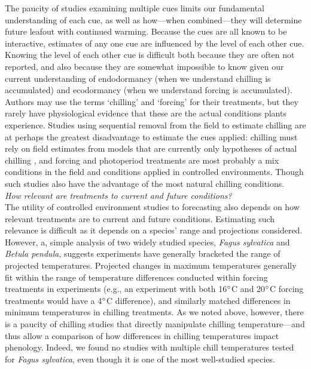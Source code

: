 \documentclass[11pt,letter]{article}
\begin{document}
The paucity of studies examining multiple cues limits our fundamental understanding of each cue, as well as how---when combined---they will determine future leafout with continued warming. Because the cues are all known to be interactive, estimates of any one cue are influenced by the level of each other cue. Knowing the level of each other cue is difficult both because they are often not reported, and also because they are somewhat impossible to know given our current understanding of endodormancy (when we understand chilling is accumulated) and ecodormancy (when we understand forcing is accumulated). Authors may use the terms `chilling' and `forcing' for their treatments, but they rarely have physiological evidence that these are the actual conditions plants experience. Studies using sequential removal from the field to estimate chilling are at perhaps the greatest disadvantage to estimate the cues applied: chilling must rely on field estimates from models that are currently only hypotheses of actual chilling \citep{dennis2003}, and forcing and photoperiod treatments are most probably a mix conditions in the field and conditions applied in controlled environments. Though such studies also have the advantage of the most natural chilling conditions. \\%

\emph{How relevant are treatments to current and future conditions?}\\
The utility of controlled environment studies to forecasting also depends on how relevant treatments are to current and future conditions. Estimating such relevance is difficult as it depends on a species' range and projections considered. However, a, simple analysis of two widely studied species, \emph{Fagus sylvatica} and \emph{Betula pendula}, suggests experiments have generally bracketed the range of projected temperatures. Projected changes in maximum temperatures generally fit within the range of temperature differences conducted within forcing treatments in experiments (e.g., an experiment with both 16$\degree$C  and 20$\degree$C forcing treatments would have a 4$\degree$C difference), and similarly matched differences in minimum temperatures in chilling treatments. As we noted above, however, there is a paucity of chilling studies that directly manipulate chilling temperature---and thus allow a comparison of how differences in chilling temperatures impact phenology. Indeed, we found no studies with multiple chill temperatures tested for \emph{Fagus sylvatica}, even though it is one of the most well-studied species. \\
\end{document}
